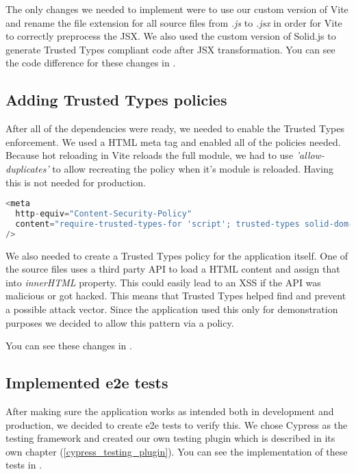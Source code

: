 The only changes we needed to implement were to use our custom version of Vite and rename the file
extension for all source files from \emph{.js} to \emph{.jsx} in order for Vite to correctly preprocess the JSX. We also used the custom version of Solid.js to generate Trusted Types compliant
code after JSX transformation. You can see the code difference for these changes in
\cite{solid_realworld_project:vite}.

\subsection{Adding Trusted Types policies}

After all of the dependencies were ready, we needed to enable the Trusted Types enforcement. We used
a HTML meta tag and enabled all of the policies needed. Because hot reloading in Vite reloads the
full module, we had to use \textit{'allow-duplicates'} to allow recreating the policy when it's
module is reloaded. Having this is not needed for production.

\bigskip
\begin{lstlisting}[language=JavaScript, caption=Creation of style elements using innerHTML in Vite \cite{commit_vite_inner_html_styles}]
<meta
  http-equiv="Content-Security-Policy"
  content="require-trusted-types-for 'script'; trusted-types solid-dom-expressions trusted-article vite-overlay 'allow-duplicates';"
/>
\end{lstlisting}

We also needed to create a Trusted Types policy for the application itself. One of the source files
uses a third party API to load a HTML content and assign that into \emph{innerHTML} property. This
could easily lead to an XSS if the API was malicious or got hacked. This means that Trusted Types
helped find and prevent a possible attack vector. Since the application used this only for
demonstration purposes we decided to allow this pattern via a policy.

You can see these changes in \cite{solid_realworld_project:tt_policy}.

\subsection{Implemented e2e tests}

After making sure the application works as intended both in development and production, we decided
to create e2e tests to verify this. We chose Cypress as the testing framework and created our own
testing plugin which is described in its own chapter (\ref{cypress_testing_plugin}). You can see the
implementation of these tests in \cite{solid_realworld_project:tests}.
